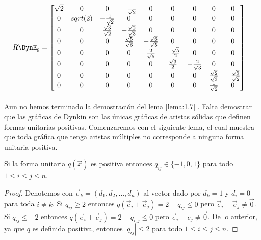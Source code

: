\begin{align*}
 R\DynE_{8} &  = \begin{bmatrix}
 \sqrt{2} & 0 & 0 & -\frac{1}{\sqrt{2}} & 0 & 0 & 0 & 0 & 0\\
 0 & sqrt(2) & - \frac{1}{\sqrt{2}}& 0 & 0 & 0 & 0 & 0 & 0\\
 0 & 0 & \frac{\sqrt{3}}{\sqrt{2}} & -\frac{\sqrt{2}}{\sqrt{3}} & 0 & 0 & 0 & 0 & 0\\
 0 & 0 & 0 & \frac{\sqrt{5}}{\sqrt{6}} & -\frac{\sqrt{6}}{\sqrt{5}} & 0 & 0 & 0 & 0\\
 0 & 0 & 0 & 0 & \frac{2}{\sqrt{5}} & -\frac{\sqrt{5}}{2} & 0 & 0 & 0\\
 0 & 0 & 0 & 0 & 0 & \frac{\sqrt{3}}{2} & -\frac{2}{\sqrt{3}} & 0 & 0\\
 0 & 0 & 0 & 0 & 0 & 0 & 0 & \frac{\sqrt{2}}{\sqrt{3}} & - \frac{\sqrt{3}}{\sqrt{2}}\\
 0 & 0 & 0 & 0 & 0 & 0 & 0 & \frac{1}{\sqrt{2}} & 0\\
 \end{bmatrix}
\end{align*}

\paragraph{}
Aun no hemos terminado la demostración del lema \ref{lema:1.7} . Falta demostrar que las gráficas de Dynkin son las únicas gráficas de aristas sólidas que definen formas unitarias positivas. Comenzaremos con el siguiente lema, el cual muestra que toda gráfica que tenga aristas múltiples no corresponde a ninguna forma unitaria positiva.

\begin{lemma}
Si la forma unitaria $q(\overrightarrow{x})$ es positiva entonces $q_{ij} \in \{-1,0,1\}$ para todo $1\leq i \le j \leq n$.
\label{lema:1.8}
\end{lemma}

\begin{proof}
Denotemos con $ \overrightarrow{e}_{k} = \left(d_{1},d_{2}, \ldots , d_{n}\right)$ al vector dado por $d_{k} = 1$ y $d_{i} = 0$ para toda $i\neq k$. Si $q_{ij} \geq 2$ entonces $q(\overrightarrow{e}_{i} + \overrightarrow{e}_{j}) = 2 - q_{ij} \leq 0$ pero $\overrightarrow{e}_{i} - \overrightarrow{e}_{j} \neq \overrightarrow{0}$. Si $q_{ij} \leq -2$ entonces $q\left(\overrightarrow{e}_{i}+ \overrightarrow{e}_{j}\right) = 2 - q_{i,j} \leq 0$ pero $\overrightarrow{e}_{i} - e_{j} \neq \overrightarrow{0}$. De lo anterior, ya que $q$ es definida positiva, entonces $|q_{ij}| \le 2$ para todo $1 \leq i \le j \leq n$.
\end{proof}

